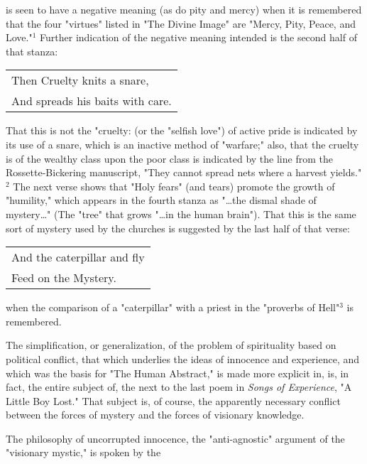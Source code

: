 \noindent is seen to have a negative meaning (as do pity and mercy) when it is remembered that the four "virtues" listed in
"The Divine Image" are "Mercy, Pity, Peace, and Love."$^{1}$ Further indication of the negative meaning intended is the second half of that stanza:\par
\begin{center}
	\begin{tabular}{l}
		Then Cruelty knits a snare, \\
		And spreads his baits with care.
	\end{tabular}
\end{center}
\hspace*{5mm}That this is not the "cruelty: (or the "selfish love") of active pride is indicated by its use of a snare, which is an
inactive method of "warfare;" also, that the cruelty is of the wealthy class upon the poor class is indicated by the line from
the Rossette-Bickering manuscript, "They cannot spread nets where a harvest yields."$^{2}$ The next verse shows that "Holy fears" (and tears) promote
the growth of "humility," which appears in the fourth stanza as "\dots the dismal shade of mystery\dots" (The "tree" that grows "\dots in the human brain").
That this is the same sort of mystery used by the churches is suggested by the last half of that verse:\par
\begin{center}
	\begin{tabular}{l}
		And the caterpillar and fly \\
		Feed on the Mystery.
	\end{tabular}
\end{center}
when the comparison of a "caterpillar" with a priest in the "proverbs of Hell"$^{3}$ is remembered.\par
\vspace*{0.5\baselineskip}
The simplification, or generalization, of the problem of spirituality based on political conflict, that which underlies
the ideas of innocence and experience, and which was the basis for "The Human Abstract," is made more explicit in, is, in fact,
the entire subject of, the next to the last poem in \textit{Songs of Experience}, "A Little Boy Lost." That subject is, of course,
the apparently necessary conflict between the forces of mystery and the forces of visionary knowledge.\par
\vspace*{0.5\baselineskip}
The philosophy of uncorrupted innocence, the "anti-agnostic" argument of the "visionary mystic," is spoken by the
